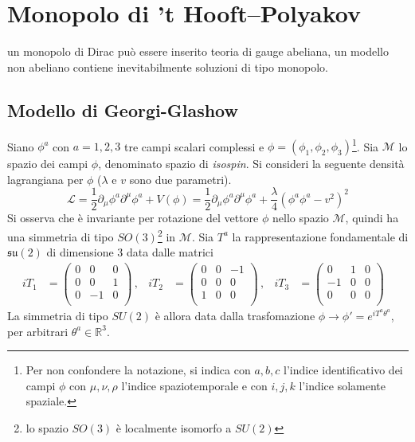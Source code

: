\section{Monopolo di ’t Hooft–Polyakov}
un monopolo di Dirac può essere inserito teoria di gauge abeliana, un modello
non abeliano contiene inevitabilmente soluzioni di tipo monopolo.
\subsection{Modello di Georgi-Glashow}
Siano $\phi^a$ con $a=1,2,3$ tre campi scalari complessi e $\phi =
(\phi _1, \phi _2,\phi _3)$\footnote{
   Per non confondere la notazione, si indica con $a,b,c$ l'indice identificativo
   dei campi $\phi$ con $\mu,\nu,\rho$ l'indice spaziotemporale e con $i,j,k$
   l'indice solamente spaziale.
}.
Sia $\mathcal{M}$ lo spazio dei campi $\phi$, denominato spazio di \emph{isospin}.
Si consideri la seguente densità lagrangiana per $\phi$ ($\lambda$ e $v$ sono due
parametri).
$$
   \mathcal{L} = \frac{1}{2} \partial _\mu \phi ^a \partial ^\mu \phi^a
                + V(\phi)
               = \frac{1}{2} \partial _\mu \phi ^a \partial ^\mu \phi^a
                + \frac{\lambda}{4}( \phi^a \phi^a - v^2 )^2
$$
Si osserva che è invariante per rotazione del vettore $\phi$ nello spazio $\mathcal{M}$,
quindi ha una simmetria di tipo $SO(3)$\footnote{
  lo spazio $SO(3)$ è localmente isomorfo a $SU(2)$
} in $\mathcal{M}$.
Sia ${T^a}$ la rappresentazione fondamentale di $\mathfrak{su(2)}$ di dimensione 3
data dalle matrici
\begin{equation}
   \begin{aligned}
      i T_1 & = \begin{pmatrix}
                   0  & 0  & 0 \\
                   0  & 0  & 1 \\
                   0  & -1 & 0 \\
                 \end{pmatrix} \, , &
      i T_2 & = \begin{pmatrix}
                   0  & 0  & -1 \\
                   0  & 0  & 0 \\
                   1  & 0  & 0 \\
                 \end{pmatrix} \, , &
      i T_3 & = \begin{pmatrix}
                   0  & 1  & 0 \\
                   -1 & 0  & 0 \\
                   0  & 0  & 0 \\
                \end{pmatrix} &
   \end{aligned}
\end{equation}
La simmetria di tipo $SU(2)$ è allora data dalla trasfomazione
$\phi \to \phi' = e^{iT^a\theta^a}$, per arbitrari $\theta^a \in \mathbb{R} ^3 $.\\

